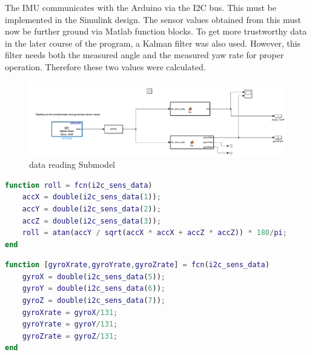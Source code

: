 The IMU communicates with the Arduino via the I2C bus. This must be implemented in the Simulink design. The sensor values obtained from this must now be further ground via Matlab function blocks. To get more trustworthy data in the later course of the program, a Kalman filter was also used. However, this filter needs both the measured angle and the measured yaw rate for proper operation. Therefore these two values were calculated. 

\begin{figure}[H]
    \centering
    \includegraphics[width=\textwidth]{Lab_report/pics/hardware_impl/gyro_read.PNG}
    \caption{data reading Submodel}
    \label{fig:acc_gyro_read}
\end{figure}

\begin{lstlisting}[language=Matlab, caption=angle calculation]
function roll = fcn(i2c_sens_data)
    accX = double(i2c_sens_data(1));
    accY = double(i2c_sens_data(2));
    accZ = double(i2c_sens_data(3));
    roll = atan(accY / sqrt(accX * accX + accZ * accZ)) * 180/pi; 
end
\end{lstlisting}

\begin{lstlisting}[language=Matlab, caption=gyro rate calculation]
function [gyroXrate,gyroYrate,gyroZrate] = fcn(i2c_sens_data)
    gyroX = double(i2c_sens_data(5));
    gyroY = double(i2c_sens_data(6));
    gyroZ = double(i2c_sens_data(7));
    gyroXrate = gyroX/131;
    gyroYrate = gyroY/131;
    gyroZrate = gyroZ/131; 
end
\end{lstlisting}